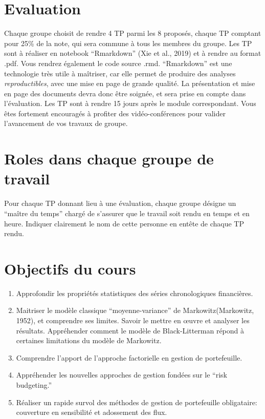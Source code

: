 \documentclass[
  11pt,
]{article}
\begin{document}
\hypertarget{evaluation}{%
\section{Evaluation}\label{evaluation}}

Chaque groupe choisit de rendre 4 TP parmi les 8 proposés, chaque TP
comptant pour 25\% de la note, qui sera commune à tous les membres du
groupe. Les TP sont à réaliser en notebook ``Rmarkdown'' (Xie et al.,
2019) et à rendre au format .pdf. Vous rendrez également le code source
.rmd. ``Rmarkdown'' est une technologie très utile à maîtriser, car elle
permet de produire des analyses \emph{reproductibles}, avec une mise en
page de grande qualité. La présentation et mise en page des documents
devra donc être soignée, et sera prise en compte dans l'évaluation. Les
TP sont à rendre 15 jours après le module correspondant. Vous êtes
fortement encouragés à profiter des vidéo-conférences pour valider
l'avancement de vos travaux de groupe.

\hypertarget{roles-dans-chaque-groupe-de-travail}{%
\section{Roles dans chaque groupe de
travail}\label{roles-dans-chaque-groupe-de-travail}}

Pour chaque TP donnant lieu à une évaluation, chaque groupe désigne un
``maître du temps'' chargé de s'assurer que le travail soit rendu en
temps et en heure. Indiquer clairement le nom de cette personne en
entête de chaque TP rendu.

\hypertarget{objectifs-du-cours}{%
\section{Objectifs du cours}\label{objectifs-du-cours}}

\begin{enumerate}
\def\labelenumi{\arabic{enumi}.}
\item
  Approfondir les propriétés statistiques des séries chronologiques
  financières.
\item
  Maitriser le modèle classique ``moyenne-variance'' de
  Markowitz(Markowitz, 1952), et comprendre ses limites. Savoir le
  mettre en œuvre et analyser les résultats. Appréhender comment le
  modèle de Black-Litterman répond à certaines limitations du modèle de
  Markowitz.
\item
  Comprendre l'apport de l'approche factorielle en gestion de
  portefeuille.
\item
  Appréhender les nouvelles approches de gestion fondées sur le ``risk
  budgeting.''
\item
  Réaliser un rapide survol des méthodes de gestion de portefeuille
  obligataire: couverture en sensibilité et adossement des flux.
\end{enumerate}
\end{document}

